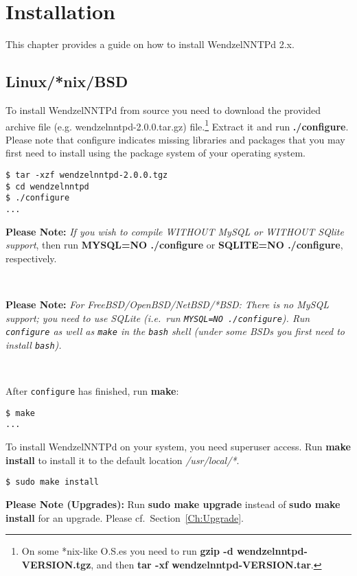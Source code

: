\chapter{Installation}

This chapter provides a guide on how to install WendzelNNTPd 2.x.

\section{Linux/*nix/BSD}

To install WendzelNNTPd from source you need to download the provided archive file (e.g. wendzelnntpd-2.0.0.tar.gz) file.\footnote{On some *nix-like O.S.es you need to run \textbf{gzip -d wendzelnntpd-VERSION.tgz}, and then \textbf{tar -xf wendzelnntpd-VERSION.tar}.} Extract it and run \textbf{./configure}. Please note that configure indicates missing libraries and packages that you may first need to install using the package system of your operating system.

\begin{verbatim}
$ tar -xzf wendzelnntpd-2.0.0.tgz
$ cd wendzelnntpd
$ ./configure
...
\end{verbatim}

\textbf{Please Note:} \textit{If you wish to compile WITHOUT MySQL or WITHOUT SQlite support}, then run \textbf{MYSQL=NO ./configure} or \textbf{SQLITE=NO ./configure}, respectively.

~

\textbf{Please Note:} \textit{For FreeBSD/OpenBSD/NetBSD/*BSD: There is no MySQL support; you need to use SQLite (i.e.\ run \texttt{MYSQL=NO ./configure}). Run \texttt{configure} as well as \texttt{make} in the \texttt{bash} shell (under some BSDs you first need to install \texttt{bash}).}

~

After \texttt{configure} has finished, run \textbf{make}:

\begin{verbatim}
$ make
...
\end{verbatim}

To install WendzelNNTPd on your system, you need superuser access. Run \textbf{make install} to install it to the default location \textit{/usr/local/*}.

\begin{verbatim}
$ sudo make install
\end{verbatim}

\textbf{Please Note (Upgrades):} Run \textbf{sudo make upgrade} instead of \textbf{sudo make install} for an upgrade. Please cf.\ Section~\ref{Ch:Upgrade}.


